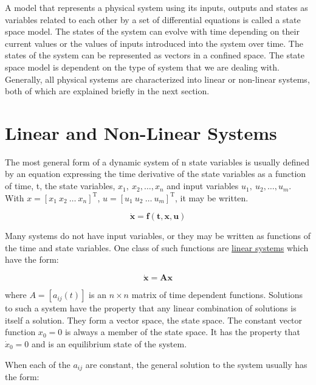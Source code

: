 \documentclass{UoNMCHA}
\numberwithin{equation}{section}
\begin{document}
	A model that represents a physical system using its inputs, outputs and states as variables related to each other by a set of differential equations is called a state space model. The states of the system can evolve with time depending on their current values or the values of inputs introduced into the system over time. The states of the system can be represented as vectors in a confined space. The state space model is dependent on the type of system that we are dealing with. Generally, all physical systems are characterized into linear or non-linear systems, both of which are explained briefly in the next section.
	
	
	\section{Linear and Non-Linear Systems}\label{Linear and Non-Linear Systems}
	
	The most general form of a dynamic system of n state variables is usually defined by an equation expressing the time derivative of the state variables as a function of time, t, the state variables, $x_1\mathrm{,\ }x_2, …, x_n$ and input variables $u_1\mathrm{,\ }u_2, …, u_m$. With $x=\left[x_1\mathrm{\ } x_2\mathrm{\ } \ldots\mathrm{\ } x_n\right]^\mathrm{T}$, $u=\left[u_1\mathrm{\ } u_2\mathrm{\ } \ldots\mathrm{\ } u_m\right]^\mathrm{T}$, it may be written. 
	
	\begin{equation}
	\mathbf{\dot{x}=f(t,x,u)}
	\end{equation}
	
	Many systems do not have input variables, or they may be written as functions of the time and state variables. One class of such functions are \underline{linear systems} which have the form:
	
	\begin{equation}
	\mathbf{\dot{x}=Ax}
	\end{equation}
	
	where $A=\left[a_{ij}(t)\right]$ is an $n\times n$ matrix of time dependent functions. Solutions to such a system have the property that any linear combination of solutions is itself a solution. They form a vector space, the state space. The constant vector function $x_0=0$ is always a member of the state space. It has the property that ${\dot{x}}_0=0$ and is an equilibrium state of the system.
	
	
	When each of the $a_{ij}$ are constant, the general solution to the system usually has the form: 
	
\end{document}

